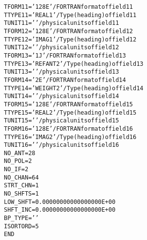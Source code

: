 \documentclass[twoside]{article}
\begin{document}
\begin{alltt}
TFORM11 = '128E    '           / FORTRAN format of field 11
TTYPE11 = 'REAL 1          '   / Type (heading) of field 11
TUNIT11 = '        '           / physical units of field 11
TFORM12 = '128E    '           / FORTRAN format of field 12
TTYPE12 = 'IMAG 1          '   / Type (heading) of field 12
TUNIT12 = '        '           / physical units of field 12
TFORM13 = '1J      '           / FORTRAN format of field 13
TTYPE13 = 'REFANT 2        '   / Type (heading) of field 13
TUNIT13 = '        '           / physical units of field 13
TFORM14 = '2E      '           / FORTRAN format of field 14
TTYPE14 = 'WEIGHT 2        '   / Type (heading) of field 14
TUNIT14 = '        '           / physical units of field 14
TFORM15 = '128E    '           / FORTRAN format of field 15
TTYPE15 = 'REAL 2          '   / Type (heading) of field 15
TUNIT15 = '        '           / physical units of field 15
TFORM16 = '128E    '           / FORTRAN format of field 16
TTYPE16 = 'IMAG 2          '   / Type (heading) of field 16
TUNIT16 = '        '           / physical units of field 16
NO_ANT  =           28
NO_POL  =            2
NO_IF   =            2
NO_CHAN =           64
STRT_CHN=            1
NO_SHFTS=            1
LOW_SHFT=   0.00000000000000000E+00
SHFT_INC=   0.00000000000000000E+00
BP_TYPE = '        '
ISORTORD=                   5
END
\end{alltt}
\end{document}
